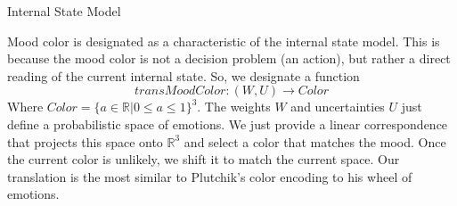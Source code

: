 \documentclass[11pt]{article}
\begin{document}
\begin{section}{Internal State Model}

Mood color is designated as a characteristic of the internal state model. This is because the mood color is not a decision problem (an action), but rather a direct reading of the current internal state. So, we designate a function 
\[transMoodColor : (W, U) \rightarrow Color\]
Where $Color = \{a \in \mathbb{R}| 0 \le a \le 1\}^3$. The weights $W$ and uncertainties $U$ just define a probabilistic space of emotions. We just provide a linear correspondence that projects this space onto $\mathbb{R}^3$ and select a color that matches the mood. Once the current color is unlikely, we shift it to match the current space. Our translation is the most similar to Plutchik's color encoding to his wheel of emotions.  

\end{section}
\end{document}
